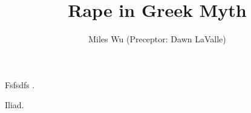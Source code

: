 \documentclass[11pt]{article}
\begin{document}
\title{Rape in Greek Myth}
\author{Miles Wu (Preceptor: Dawn LaValle)}
\maketitle

\begin{abstract}

\end{abstract}

\newpage

Fsfsdfs \cite{iliad}.

\newpage
\begin{thebibliography}{9}
		Iliad.
\end{thebibliography}
\end{document}
